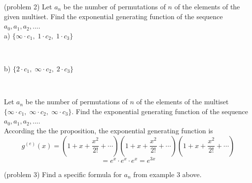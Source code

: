 \documentclass[handout]{ximera}
\begin{document}
\begin{problem}(problem 2)
Let $a_n$ be the number of permutations of $n$ of the elements of the given multiset. 
Find the exponential generating function of the sequence $a_0, a_1, a_2, ...$.\\
a) $\{\infty  \cdot c_1, \;1 \cdot c_2,\; 1\cdot c_3\}$ 
\begin{multipleChoice}
\\
\end{multipleChoice}



b) $\{2 \cdot c_1,\; \infty \cdot c_2,\; 2 \cdot c_3\}$ 
\begin{multipleChoice}
\\
\end{multipleChoice}

\end{problem}




\begin{example}[example 3]
Let $a_n$ be the number of permutations of $n$ of the elements of the multiset $\{\infty \cdot c_1,\; \infty \cdot c_2, \;\infty \cdot c_3\}$.
Find the exponential generating function of the sequence $a_0, a_1, a_2, ...$.\\
According the the proposition, the exponential generating function is
\[
g^{(e)}(x) = \left(1 + x + \frac{x^2}{2!} + \cdots \right)\left(1 + x + \frac{x^2}{2!} + \cdots \right)
\left(1 + x + \frac{x^2}{2!} + \cdots \right)
\]
\[
= e^x \cdot e^x \cdot e^x = e^{3x}
\]
\end{example}

\begin{problem}(problem 3)
Find a specific formula for $a_n$ from example 3 above.\\
\begin{multipleChoice}
\\
\\
\end{multipleChoice}
\end{problem}
\end{document}
